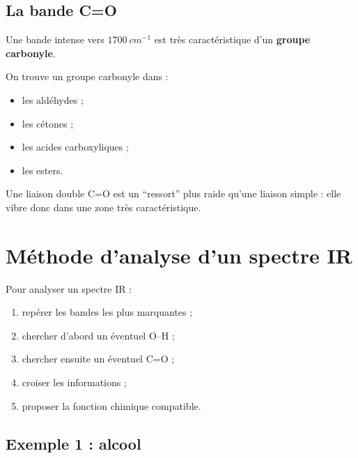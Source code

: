 \documentclass[11pt,a4paper]{article}
\begin{document}
\subsection{La bande C=O}

\begin{proprietebox}
Une bande intense vers \(1700\ \si{cm^{-1}}\) est très caractéristique d’un \textbf{groupe carbonyle}.
\end{proprietebox}

\begin{exemplebox}
On trouve un groupe carbonyle dans :
\begin{itemize}
    \item les aldéhydes ;
    \item les cétones ;
    \item les acides carboxyliques ;
    \item les esters.
\end{itemize}
\end{exemplebox}

\begin{analogebox}
Une liaison double C=O est un ``ressort'' plus raide qu’une liaison simple : elle vibre donc dans une zone très caractéristique.
\end{analogebox}

\section{Méthode d’analyse d’un spectre IR}

\begin{methodebox}
Pour analyser un spectre IR :
\begin{enumerate}
    \item repérer les bandes les plus marquantes ;
    \item chercher d’abord un éventuel O--H ;
    \item chercher ensuite un éventuel C=O ;
    \item croiser les informations ;
    \item proposer la fonction chimique compatible.
\end{enumerate}
\end{methodebox}

\subsection{Exemple 1 : alcool}
\end{document}
